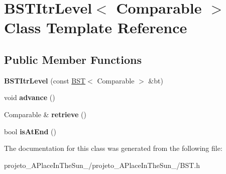\hypertarget{class_b_s_t_itr_level}{}\section{B\+S\+T\+Itr\+Level$<$ Comparable $>$ Class Template Reference}
\label{class_b_s_t_itr_level}
\subsection*{Public Member Functions}
\begin{DoxyCompactItemize}
\item 
\hypertarget{class_b_s_t_itr_level_a8fd5cdde93eb182c4cd5cf6b2c5efaeb}{}\label{class_b_s_t_itr_level_a8fd5cdde93eb182c4cd5cf6b2c5efaeb} 
{\bfseries B\+S\+T\+Itr\+Level} (const \hyperlink{class_b_s_t}{B\+ST}$<$ Comparable $>$ \&bt)
\item 
\hypertarget{class_b_s_t_itr_level_ad54a6fa289a59d6050b507abe40d463b}{}\label{class_b_s_t_itr_level_ad54a6fa289a59d6050b507abe40d463b} 
void {\bfseries advance} ()
\item 
\hypertarget{class_b_s_t_itr_level_a0340bd9f21f72ae25348f383e67e7f91}{}\label{class_b_s_t_itr_level_a0340bd9f21f72ae25348f383e67e7f91} 
Comparable \& {\bfseries retrieve} ()
\item 
\hypertarget{class_b_s_t_itr_level_a89bc8e81dde255fd6bad917cacc0d489}{}\label{class_b_s_t_itr_level_a89bc8e81dde255fd6bad917cacc0d489} 
bool {\bfseries is\+At\+End} ()
\end{DoxyCompactItemize}


The documentation for this class was generated from the following file\+:\begin{DoxyCompactItemize}
\item 
projeto\+\_\+\+A\+Place\+In\+The\+Sun\+\_/projeto\+\_\+\+A\+Place\+In\+The\+Sun\+\_/B\+S\+T.\+h\end{DoxyCompactItemize}
